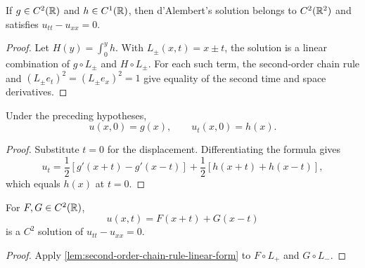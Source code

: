 \begin{theorem}[Solution of wave equation, $n = 1$]
\label{thm:wave-equation-dalembert-solution}





If $g\in C^2(\mathbb{R})$ and $h\in C^1(\mathbb{R})$, then d'Alembert's solution belongs to
$C^2(\mathbb{R}^2)$ and satisfies $u_{tt}-u_{xx}=0$.
\end{theorem}
\begin{proof}

\sketch Let $H(y)=\int_0^yh$. With $L_\pm(x,t)=x\pm t$, the solution is a
linear combination of $g\circ L_\pm$ and $H\circ L_\pm$. For each such term,
the second-order chain rule and $(L_\pm e_t)^2=(L_\pm e_x)^2=1$ give equality
of the second time and space derivatives.
\end{proof}

\begin{theorem}
\label{thm:dalembert-initial-conditions}





Under the preceding hypotheses,
$$u(x,0)=g(x),
\qquad
u_t(x,0)=h(x).$$
\end{theorem}
\begin{proof}

\sketch Substitute $t=0$ for the displacement. Differentiating the formula
gives
$$u_t=\frac12[g'(x+t)-g'(x-t)]
+\frac12[h(x+t)+h(x-t)],$$
which equals $h(x)$ at $t=0$.
\end{proof}

\begin{theorem}
\label{thm:wave-1d-general-solution}





For $F,G\in C^2(\mathbb{R})$,
$$u(x,t)=F(x+t)+G(x-t)$$
is a $C^2$ solution of $u_{tt}-u_{xx}=0$.
\end{theorem}
\begin{proof}

\sketch Apply \cref{lem:second-order-chain-rule-linear-form} to
$F\circ L_+$ and $G\circ L_-$.
\end{proof}

